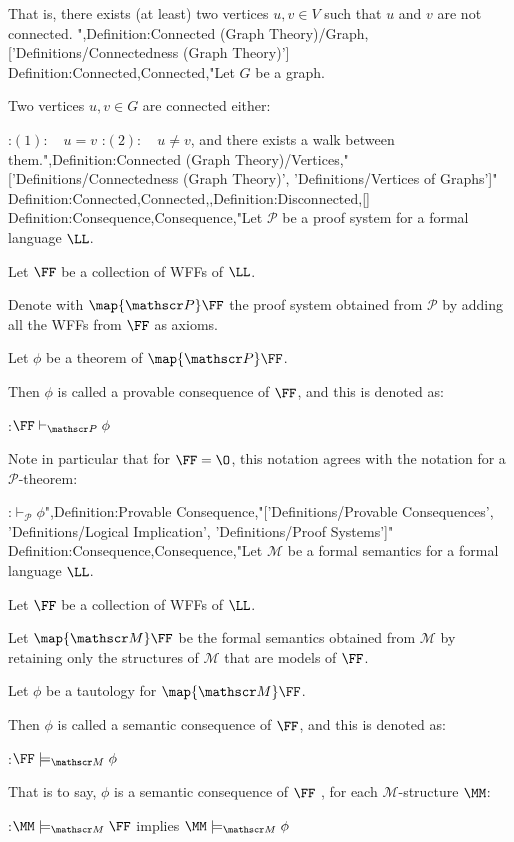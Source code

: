That is,  there exists (at least) two vertices $u, v \in V$ such that $u$ and $v$ are not connected.
",Definition:Connected (Graph Theory)/Graph,['Definitions/Connectedness (Graph Theory)']
Definition:Connected,Connected,"Let $G$ be a graph.

Two vertices $u, v \in G$ are connected  either:

:$(1): \quad u = v$
:$(2): \quad u \ne v$, and there exists a walk between them.",Definition:Connected (Graph Theory)/Vertices,"['Definitions/Connectedness (Graph Theory)', 'Definitions/Vertices of Graphs']"
Definition:Connected,Connected,,Definition:Disconnected,[]
Definition:Consequence,Consequence,"Let $\mathscr P$ be a proof system for a formal language $\LL$.

Let $\FF$ be a collection of WFFs of $\LL$.


Denote with $\map {\mathscr P} \FF$ the proof system obtained from $\mathscr P$ by adding all the WFFs from $\FF$ as axioms.

Let $\phi$ be a theorem of $\map {\mathscr P} \FF$.


Then $\phi$ is called a provable consequence of $\FF$, and this is denoted as:

:$\FF \vdash_{\mathscr P} \phi$


Note in particular that for $\FF = \O$, this notation agrees with the notation for a $\mathscr P$-theorem:

:$\vdash_{\mathscr P} \phi$",Definition:Provable Consequence,"['Definitions/Provable Consequences', 'Definitions/Logical Implication', 'Definitions/Proof Systems']"
Definition:Consequence,Consequence,"Let $\mathscr M$ be a formal semantics for a formal language $\LL$.

Let $\FF$ be a collection of WFFs of $\LL$.


Let $\map {\mathscr M} \FF$ be the formal semantics obtained from $\mathscr M$ by retaining only the structures of $\mathscr M$ that are models of $\FF$.

Let $\phi$ be a tautology for $\map {\mathscr M} \FF$.


Then $\phi$ is called a semantic consequence of $\FF$, and this is denoted as:

:$\FF \models_{\mathscr M} \phi$


That is to say, $\phi$ is a semantic consequence of $\FF$ , for each $\mathscr M$-structure $\MM$:

:$\MM \models_{\mathscr M} \FF$ implies $\MM \models_{\mathscr M} \phi$

